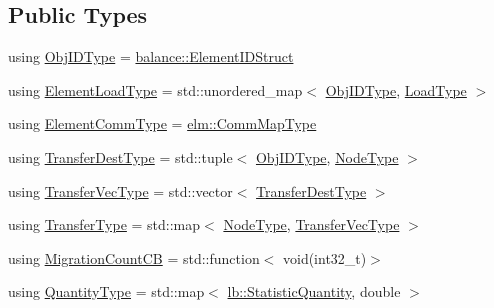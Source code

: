 \subsection*{Public Types}
\begin{DoxyCompactItemize}
\item 
using \hyperlink{structvt_1_1vrt_1_1collection_1_1lb_1_1_base_l_b_a790b22acf448880599724749cdc4e9b3}{Obj\+I\+D\+Type} = \hyperlink{namespacevt_1_1vrt_1_1collection_1_1balance_a9f5b53fafb270212279a4757d2c4cd28}{balance\+::\+Element\+I\+D\+Struct}
\item 
using \hyperlink{structvt_1_1vrt_1_1collection_1_1lb_1_1_base_l_b_adfae019ae1d55a6bf4f080f9b455fca4}{Element\+Load\+Type} = std\+::unordered\+\_\+map$<$ \hyperlink{structvt_1_1vrt_1_1collection_1_1lb_1_1_base_l_b_a790b22acf448880599724749cdc4e9b3}{Obj\+I\+D\+Type}, \hyperlink{namespacevt_a8fb51741340b87d7aaee0bef60e9896b}{Load\+Type} $>$
\item 
using \hyperlink{structvt_1_1vrt_1_1collection_1_1lb_1_1_base_l_b_a83eb4daec14edfb8780422e95b8e38d3}{Element\+Comm\+Type} = \hyperlink{namespacevt_1_1elm_a38487cb8896b9b4763efa9022fab560e}{elm\+::\+Comm\+Map\+Type}
\item 
using \hyperlink{structvt_1_1vrt_1_1collection_1_1lb_1_1_base_l_b_add886785f64ea725005f1263fd1393be}{Transfer\+Dest\+Type} = std\+::tuple$<$ \hyperlink{structvt_1_1vrt_1_1collection_1_1lb_1_1_base_l_b_a790b22acf448880599724749cdc4e9b3}{Obj\+I\+D\+Type}, \hyperlink{namespacevt_a866da9d0efc19c0a1ce79e9e492f47e2}{Node\+Type} $>$
\item 
using \hyperlink{structvt_1_1vrt_1_1collection_1_1lb_1_1_base_l_b_a329e8179ec41a1bd4924c79fe23a79af}{Transfer\+Vec\+Type} = std\+::vector$<$ \hyperlink{structvt_1_1vrt_1_1collection_1_1lb_1_1_base_l_b_add886785f64ea725005f1263fd1393be}{Transfer\+Dest\+Type} $>$
\item 
using \hyperlink{structvt_1_1vrt_1_1collection_1_1lb_1_1_base_l_b_a0a5f834082d85c558bdaf84c464c1ead}{Transfer\+Type} = std\+::map$<$ \hyperlink{namespacevt_a866da9d0efc19c0a1ce79e9e492f47e2}{Node\+Type}, \hyperlink{structvt_1_1vrt_1_1collection_1_1lb_1_1_base_l_b_a329e8179ec41a1bd4924c79fe23a79af}{Transfer\+Vec\+Type} $>$
\item 
using \hyperlink{structvt_1_1vrt_1_1collection_1_1lb_1_1_base_l_b_aba7198eb30aef1b19c1f1efdea760543}{Migration\+Count\+CB} = std\+::function$<$ void(int32\+\_\+t)$>$
\item 
using \hyperlink{structvt_1_1vrt_1_1collection_1_1lb_1_1_base_l_b_a864b2c437d81680577013741e265ef0d}{Quantity\+Type} = std\+::map$<$ \hyperlink{namespacevt_1_1vrt_1_1collection_1_1lb_a74989c7b4dd16fcc067e90a29cd1febe}{lb\+::\+Statistic\+Quantity}, double $>$

\end{DoxyCompactItemize}
